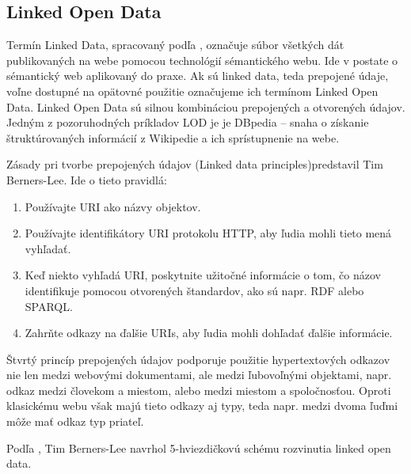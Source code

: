 \subsection{Linked Open Data} \label{secLinkedData}
Termín Linked Data, spracovaný podľa \cite{linkedData}, označuje súbor všetkých dát publikovaných na webe pomocou technológií sémantického webu. Ide v postate o sémantický web aplikovaný do praxe. Ak sú linked data, teda prepojené údaje, voľne dostupné na opätovné použitie označujeme ich termínom Linked Open Data. Linked Open Data sú silnou kombináciou prepojených a otvorených údajov. Jedným z pozoruhodných príkladov LOD je je DBpedia –
snaha o získanie štruktúrovaných informácií z Wikipedie a ich sprístupnenie na webe.

Zásady pri tvorbe prepojených údajov (Linked data principles)predstavil Tim Berners-Lee. Ide o tieto pravidlá:

\begin{enumerate}
\item Používajte URI ako názvy objektov.
\item Používajte identifikátory URI protokolu HTTP, aby ľudia mohli tieto mená vyhľadať.
\item Keď niekto vyhľadá URI, poskytnite užitočné informácie o tom, čo názov identifikuje pomocou otvorených štandardov, ako sú napr. RDF alebo SPARQL.
\item Zahrňte odkazy na ďalšie URIs, aby ľudia mohli dohľadať ďalšie informácie.
\end{enumerate}

Štvrtý princíp prepojených údajov podporuje použitie hypertextových odkazov nie
len medzi webovými dokumentami, ale medzi ľubovoľnými objektami, napr. odkaz
medzi človekom a miestom, alebo medzi miestom a spoločnosťou. Oproti klasickému
webu však majú tieto odkazy aj typy, teda napr. medzi dvoma ľuďmi môže mať odkaz
typ priateľ.

Podľa \cite{linkedData5star}, Tim Berners-Lee navrhol 5-hviezdičkovú schému rozvinutia linked open data.

